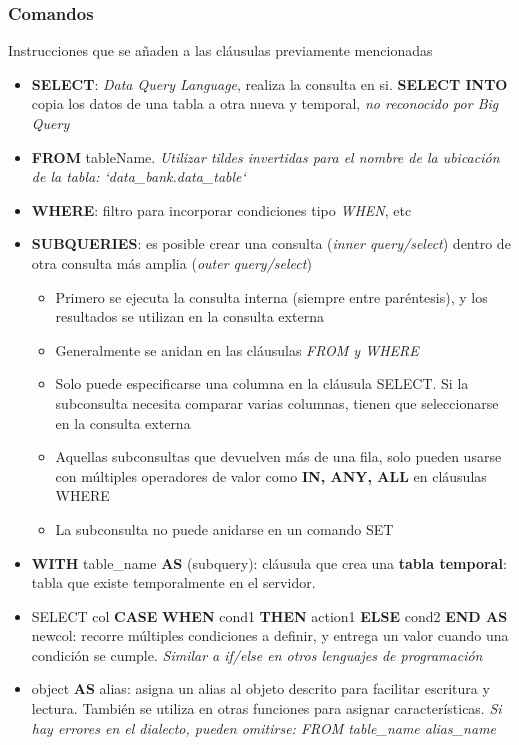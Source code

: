 \subsubsection{Comandos}
Instrucciones que se añaden a las cláusulas previamente mencionadas
\begin{itemize}
    \item {\textbf{SELECT}: \textit{Data Query Language}, realiza la consulta en si. \textbf{SELECT INTO} copia los datos de una tabla a otra nueva y temporal, \textit{no reconocido por Big Query}}
    \item {\textbf{FROM} tableName. \textit{Utilizar tildes invertidas para el nombre de la ubicación de la tabla: `data\_bank.data\_table`}}
    \item {\textbf{WHERE}: filtro para incorporar condiciones tipo \textit{WHEN}, etc}
    \item {\textbf{SUBQUERIES}: es posible crear una consulta (\textit{inner query/select}) dentro de otra consulta más amplia (\textit{outer query/select}) 
    \begin{itemize}
        \item {Primero se ejecuta la consulta interna (siempre entre paréntesis), y los resultados se utilizan en la consulta externa}
        \item {Generalmente se anidan en las cláusulas \textit{FROM y WHERE}}
        \item {Solo puede especificarse una columna en la cláusula SELECT. Si la subconsulta necesita comparar varias columnas, tienen que seleccionarse en la consulta externa}
        \item {Aquellas subconsultas que devuelven más de una fila, solo pueden usarse con múltiples operadores de valor como \textbf{IN, ANY, ALL} en cláusulas WHERE}
        \item {La subconsulta no puede anidarse en un comando SET}
    \end{itemize}}
    \item {\textbf{WITH} table\_name \textbf{AS} (subquery): cláusula que crea una \textbf{tabla temporal}: tabla que existe temporalmente en el servidor.}
    \item {SELECT col \textbf{CASE} \textbf{WHEN} cond1 \textbf{THEN} action1 \textbf{ELSE} cond2 \textbf{END AS} newcol: recorre múltiples condiciones a definir, y entrega un valor cuando una condición se cumple. \textit{Similar a if/else en otros lenguajes de programación}}
    \item {object \textbf{AS} alias: asigna un alias al objeto descrito para facilitar escritura y lectura. También se utiliza en otras funciones para asignar características. \textit{Si hay errores en el dialecto, pueden omitirse: FROM table\_name alias\_name}}

\end{itemize}
